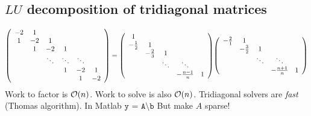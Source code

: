 \documentclass{article}
\begin{document}
        \subsection{$LU$ decomposition of tridiagonal matrices}
            \begin{align}
                \qty(\begin{array}{cccccc}
                    -2 & 1 & & & & \\
                    1 & -2 & 1 & & & \\
                    & 1 & -2 & 1 & & \\
                    & & \ddots & \ddots & \ddots & \\
                    & & & 1 & -2 & 1 \\
                    & & & & 1 & -2
                \end{array}) = \qty(\begin{array}{ccccc}
                    1 & & & & \\
                    -\frac{1}{2} & 1 & &\\
                    & -\frac{2}{3} & 1 & \\
                    & & \ddots & \ddots \\
                    & & & -\frac{n-1}{n} & 1
                \end{array})\qty(\begin{array}{ccccc}
                    -\frac{2}{1} & 1 & & & \\
                    & -\frac{3}{2} & 1 & & \\
                    & & \ddots & \ddots & \\
                    & & & -\frac{n+1}{n} & 1 
                \end{array})
            \end{align}
            Work to factor is $\order{n}$.  Work to solve is also $\order{n}$.  Tridiagonal solvers are \emph{fast} (Thomas algorithm).  In Matlab $\texttt{y = A\textbackslash b}$  But make $A$ sparse!
    
\end{document}
